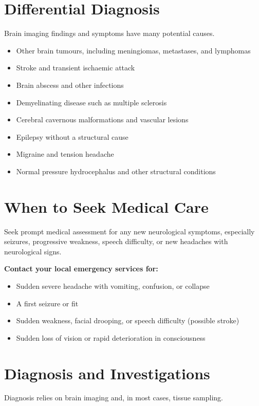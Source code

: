 \section*{Differential Diagnosis}
Brain imaging findings and symptoms have many potential causes.

\begin{itemize}
    \item Other brain tumours, including meningiomas, metastases, and lymphomas
    \item Stroke and transient ischaemic attack
    \item Brain abscess and other infections
    \item Demyelinating disease such as multiple sclerosis
    \item Cerebral cavernous malformations and vascular lesions
    \item Epilepsy without a structural cause
    \item Migraine and tension headache
    \item Normal pressure hydrocephalus and other structural conditions
\end{itemize}

\section*{When to Seek Medical Care}
Seek prompt medical assessment for any new neurological symptoms, especially seizures, progressive weakness, speech difficulty, or new headaches with neurological signs.

\textbf{Contact your local emergency services for:}
\begin{itemize}
    \item Sudden severe headache with vomiting, confusion, or collapse
    \item A first seizure or fit
    \item Sudden weakness, facial drooping, or speech difficulty (possible stroke)
    \item Sudden loss of vision or rapid deterioration in consciousness
\end{itemize}

\section*{Diagnosis and Investigations}
Diagnosis relies on brain imaging and, in most cases, tissue sampling.

